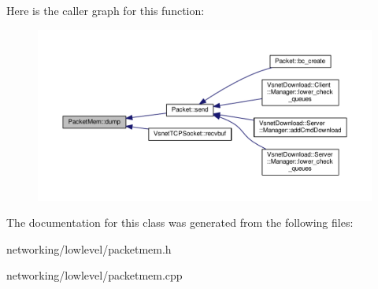 Here is the caller graph for this function\+:
\nopagebreak
\begin{figure}[H]
\begin{center}
\leavevmode
\includegraphics[width=350pt]{d3/d70/classPacketMem_a1588778e59bd93c42a199d717de239c6_icgraph}
\end{center}
\end{figure}




The documentation for this class was generated from the following files\+:\begin{DoxyCompactItemize}
\item 
networking/lowlevel/packetmem.\+h\item 
networking/lowlevel/packetmem.\+cpp\end{DoxyCompactItemize}
